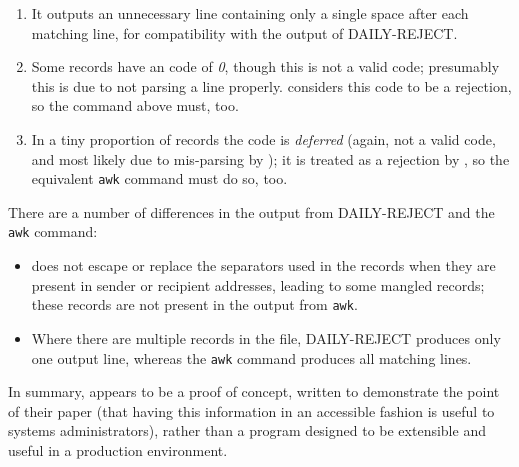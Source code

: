 \begin{enumerate}

    \item It outputs an unnecessary line containing only a single space
        after each matching line, for compatibility with the output of
        DAILY-REJECT\@.

    \item Some records have an \SMTP{} code of \textit{0}, though this is
        not a valid \SMTP{} code; presumably this is due to \LMA{} not
        parsing a line properly.  \LMA{} considers this code to be a
        rejection, so the command above must, too.

    \item In a tiny proportion of records the \SMTP{} code is
        \textit{deferred\/} (again, not a valid code, and most likely due
        to mis-parsing by \LMA{}); it is treated as a rejection by \LMA{},
        so the equivalent \texttt{awk} command must do so, too.

\end{enumerate}

There are a number of differences in the output from DAILY-REJECT and the
\texttt{awk} command:

\begin{itemize}

    \item \LMA{} does not escape or replace the separators used in the
        \CSV{} records when they are present in sender or recipient
        addresses, leading to some mangled records; these records are not
        present in the output from \texttt{awk}.

    \item Where there are multiple records in the \CSV{} file, DAILY-REJECT
        produces only one output line, whereas the \texttt{awk} command
        produces all matching lines.

\end{itemize}

In summary, \LMA{} appears to be a proof of concept, written to demonstrate
the point of their paper (that having this information in an accessible
fashion is useful to systems administrators), rather than a program
designed to be extensible and useful in a production environment.

